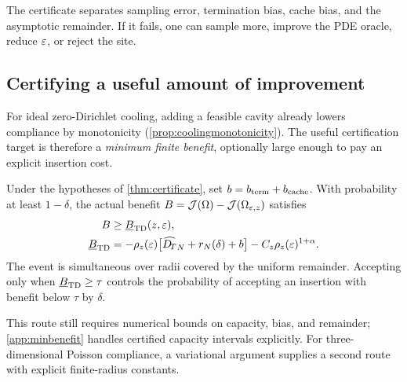 The certificate separates sampling error, termination bias, cache bias, and
the asymptotic remainder.  If it fails, one can sample more, improve the PDE
oracle, reduce $\varepsilon$, or reject the site.

\subsection{Certifying a useful amount of improvement}
\label{sec:minbenefit}

For ideal zero-Dirichlet cooling, adding a feasible cavity already lowers
compliance by monotonicity (\cref{prop:coolingmonotonicity}). The useful
certification target is therefore a \emph{minimum finite benefit}, optionally
large enough to pay an explicit insertion cost.

\begin{theorem}
\label{thm:minbenefit}
Under the hypotheses of \cref{thm:certificate}, set
$b=b_{\rm term}+b_{\rm cache}$. With probability at least $1-\delta$, the
actual benefit $B=\mathcal{J}(\Omega)-\mathcal{J}(\Omega_{\varepsilon,z})$ satisfies
\begin{equation}
 \begin{split}
 B&\ge\underline B_{\rm TD}(z,\varepsilon),\\
 \underline B_{\rm TD}
 &=-\rho_z(\varepsilon)\bigl[\widehat{D_{\!T}}_N+r_N(\delta)+b\bigr]
   -C_z\rho_z(\varepsilon)^{1+\alpha}.
 \end{split}
 \label{eq:minimumbenefit}
\end{equation}
The event is simultaneous over radii covered by the uniform remainder.
Accepting only when $\underline B_{\rm TD}\ge\tau$ controls the probability
of accepting an insertion with benefit below $\tau$ by $\delta$.
\end{theorem}

This route still requires numerical bounds on capacity, bias, and remainder;
\cref{app:minbenefit} handles certified capacity intervals explicitly. For
three-dimensional Poisson compliance, a variational argument supplies a
second route with explicit finite-radius constants.

